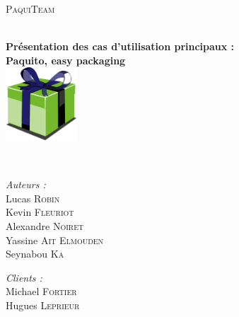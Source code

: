 \begin{titlepage}
	\begin{center}
	
		
		\vfill
					
		\textsc{\LARGE PaquiTeam}\\[1.5cm]
		
		\HRule \\[0.4cm]
			{ \huge \bfseries Présentation des cas d'utilisation principaux :\\
			Paquito, easy packaging\\[0.4cm]
			\includegraphics[width=0.2\textwidth]{../img/paquito.png}
	
			}
		\HRule \\[1.5cm]
		
		\begin{minipage}{0.40\textwidth}
			\begin{flushleft} \large
				\emph{Auteurs :}\\
				Lucas \textsc{Robin}\\
				Kevin \textsc{Fleuriot}\\
				Alexandre \textsc{Noiret}\\
				Yassine \textsc{Ait Elmouden}\\
				Seynabou \textsc{Ka}
			\end{flushleft}
		\end{minipage}
		\hfill
		\begin{minipage}{0.40\textwidth}
			\begin{flushright} \large
				\emph{Clients :}\\
				Michael \textsc{Fortier}\\
				Hugues \textsc{Leprieur}
			\end{flushright}
		\end{minipage}


\end{center}
\end{titlepage}
